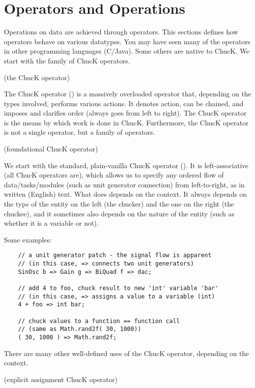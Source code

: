 \chapter{Operators and Operations}

Operations on data are achieved through operators. This sections defines how operators behave on various datatypes. You may have seen many of the operators in other programming languages (C/Java). Some others are native to ChucK. We start with the family of ChucK operators.

 

\chuckop (the ChucK operator)

The ChucK operator (\chuckop) is a massively overloaded operator that, depending on the types involved, performs various actions. It denotes action, can be chained, and imposes and clarifies order (always goes from left to right). The ChucK operator is the means by which work is done in ChucK. Furthermore, the ChucK operator is not a single operator, but a family of operators.

\chuckop (foundational ChucK operator)

We start with the standard, plain-vanilla ChucK operator (\chuckop). It is left-associative (all ChucK operators are), which allows us to specify any ordered flow of data/tasks/modules (such as unit generator connection) from left-to-right, as in written (English) text.  What \chuckop does depends on the context. It always depends on the type of the entity on the left (the chucker) and the one on the right (the chuckee), and it sometimes  also depends on the nature of the entity (such as whether it is a variable or not).

Some examples:
\begin{verbatim}
    // a unit generator patch - the signal flow is apparent
    // (in this case, => connects two unit generators)
    SinOsc b => Gain g => BiQuad f => dac;

    // add 4 to foo, chuck result to new 'int' variable 'bar'
    // (in this case, => assigns a value to a variable (int)
    4 + foo => int bar;

    // chuck values to a function == function call
    // (same as Math.rand2f( 30, 1000))
    ( 30, 1000 ) => Math.rand2f;
\end{verbatim}

There are many other well-defined uses of the ChucK operator, depending on the context.

\atchuckop (explicit assignment ChucK operator)

